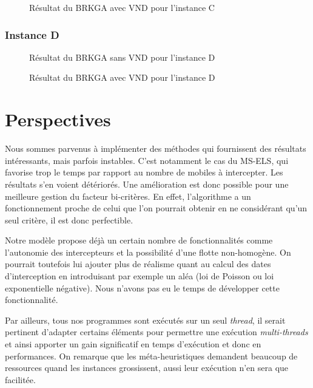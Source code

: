                 \begin{figure}[H]
                	
                \caption{Résultat du BRKGA avec VND pour l'instance C}
				\label{fig:30m4i3d-avecvnd}
				\end{figure}
				
            \subsubsection{Instance D}
            	\begin{figure}[H]
                	
                \caption{Résultat du BRKGA sans VND pour l'instance D}
				\label{fig:40m5i4d-sansvnd}
                \end{figure}
                
                \begin{figure}[H]
                	
                \caption{Résultat du BRKGA avec VND pour l'instance D}
				\label{fig:40m5i4d-avecvnd}
				\end{figure}
				
    \newpage
    \section{Perspectives}

        Nous sommes parvenus à implémenter des méthodes qui fournissent des résultats intéressants, mais parfois instables. C'est notamment le cas du MS-ELS, qui favorise trop le temps par rapport au nombre de mobiles à intercepter. Les résultats s'en voient détériorés. Une amélioration est donc possible pour une meilleure gestion du facteur bi-critères. En effet, l'algorithme a un fonctionnement proche de celui que l'on pourrait obtenir en ne considérant qu'un seul critère, il est donc perfectible.

        Notre modèle propose déjà un certain nombre de fonctionnalités comme l'autonomie des intercepteurs et la possibilité d'une flotte non-homogène. On pourrait toutefois lui ajouter plus de réalisme quant au calcul des dates d'interception en introduisant par exemple un aléa (loi de Poisson ou loi exponentielle négative). Nous n'avons pas eu le temps de développer cette fonctionnalité.

        Par ailleurs, tous nos programmes sont exécutés sur un seul \emph{thread}, il serait pertinent d'adapter certains éléments pour permettre une exécution \emph{multi-threads} et ainsi apporter un gain significatif en temps d'exécution et donc en performances. On remarque que les méta-heuristiques demandent beaucoup de ressources quand les instances grossissent, aussi leur exécution n'en sera que facilitée.
